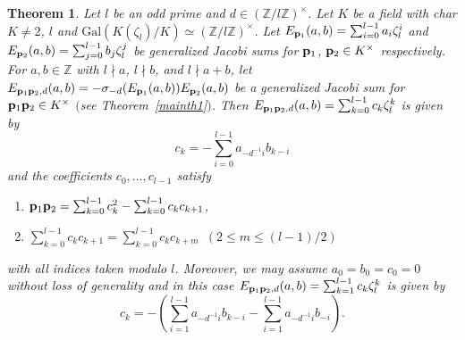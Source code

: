 \documentclass[a4paper, 11pt]{amsart}
\newcommand{\Z}{\mathbb Z}
\newcommand{\Gal}{\mathrm{Gal}}
\theoremstyle{plain}
\newtheorem{thm}{Theorem}[section]
\theoremstyle{definition}
\numberwithin{equation}{section}
\begin{document}
\begin{thm}\label{thm:BF}
Let $l$ be an odd prime and $d \in (\Z/l\Z)^{\times}$. 
Let $K$ be a field with char $K\neq 2$, $l$ 
and $\Gal(K(\zeta_l)/K)\simeq (\Z/l\Z)^{\times}$. 
Let
$E_{{\bf p}_1}(a,b)=\sum_{i=0}^{l-1}a_i\zeta_l^i$ and $E_{{\bf p}_2}(a,b)=\sum_{j=0}^{l-1}b_j\zeta_l^j$
be
generalized Jacobi sums for 
${\bf p}_1$, ${\bf p}_2\in K^\times$ respectively. 
For $a,b\in \Z$ with $l\nmid a$, $l\nmid b$, and $l\nmid a+b$,
let $E_{{\bf p}_1{\bf p}_2,d}(a,b)=-\sigma_{-d}(E_{{\bf p}_1}(a,b))E_{{\bf p}_2}(a,b)$
be a generalized Jacobi sum for ${\bf p}_1{\bf p}_2\in K^\times$ 
$($see Theorem~\ref{mainth1}$)$.
Then $E_{{\bf p}_1{\bf p}_2,d}(a,b)=\sum_{k=0}^{l-1}c_k\zeta_l^k$ 
is  given by
$$c_k=-\sum_{i=0}^{l-1}a_{-d^{-1}i}b_{k-i}$$
and the coefficients $c_{0},\dots,c_{l-1}$ satisfy
\begin{enumerate}
\item ${\bf p}_1{\bf p}_2=\sum_{k=0}^{l-1}c_k^2 - \sum_{k=0}^{l-1}c_kc_{k+1}$,
\item $\sum_{k=0}^{l-1}c_kc_{k+1}
=\sum_{k=0}^{l-1}c_kc_{k+m}$\ $(2\leq m\leq (l-1)/2)$
\end{enumerate}
with all indices taken modulo $l$.
Moreover, we may assume $a_0=b_0=c_0=0$ 
without loss of generality and in this case 
$E_{{\bf p}_1{\bf p}_2,d}(a,b)=\sum_{k=1}^{l-1}c_k\zeta_l^k$ 
is  given by 
$$c_k=-\left( \sum_{i=1}^{l-1}a_{-d^{-1}i}b_{k-i} - \sum_{i=1}^{l-1}a_{-d^{-1}i}b_{-i}\right).$$
\end{thm}
\end{document}
